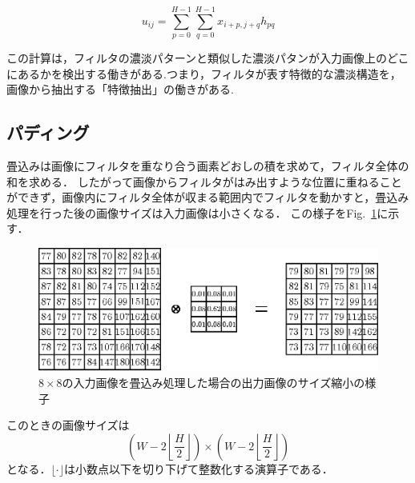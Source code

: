 \documentclass[a4paper,10pt]{jsarticle}
\begin{document}
\[ u_{ij} = \sum_{p=0}^{H-1} \sum_{q=0}^{H-1} x_{i+p,j+q} h_{pq} \]

この計算は，フィルタの濃淡パターンと類似した濃淡パタンが入力画像上のどこにあるかを検出する働きがある.つまり，フィルタが表す特徴的な濃淡構造を，画像から抽出する「特徴抽出」の働きがある.


\subsection{パディング}
畳込みは画像にフィルタを重なり合う画素どおしの積を求めて，フィルタ全体の和を求める．
したがって画像からフィルタがはみ出すような位置に重ねることができず，画像内にフィルタ全体が収まる範囲内でフィルタを動かすと，畳込み処理を行った後の画像サイズは入力画像は小さくなる．
この様子をFig.~\ref{fig:88の入力画像を畳込み処理した場合の出力画像のサイズ縮小の様子}に示す．
\begin{figure}[ht]
  \begin{center}
    \includegraphics[clip,scale=0.8]{fig/eps/convolution.eps}
  \end{center}
  \caption{$8\times 8$の入力画像を畳込み処理した場合の出力画像のサイズ縮小の様子}
  \label{fig:88の入力画像を畳込み処理した場合の出力画像のサイズ縮小の様子}
\end{figure}

このときの画像サイズは
\begin{equation}
  \left(W-2\left\lfloor \frac{H}{2}\right\rfloor\right)\times \left(W-2\left\lfloor \frac{H}{2}\right\rfloor\right)
\end{equation}
となる．$\lfloor \cdot \rfloor$は小数点以下を切り下げて整数化する演算子である．
\end{document}

